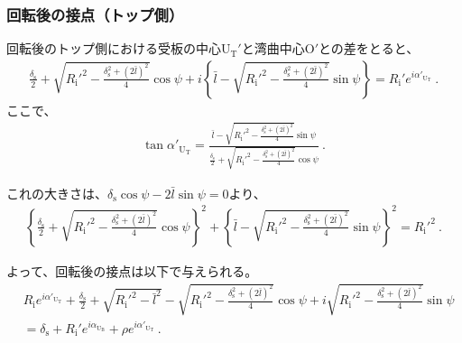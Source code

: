 \clearpage
\subsubsection{回転後の接点（トップ側）}
回転後のトップ側における受板の中心U$_\mathrm T'$と湾曲中心O$'$との差をとると、
\begin{align*}
  \frac{\delta_\mathrm s}2+\sqrt{R_\mathrm i'^2-\frac{\delta_\mathrm s^2+(2\bar l)^2}4}\cos\psi
  +i\left\{\bar l-\sqrt{R_\mathrm i'^2-\frac{\delta_\mathrm s^2+(2\bar l)^2}4}\sin\psi\right\}
  = R_\mathrm i'e^{i\alpha'_{\mathrm U_\mathrm T}}\ .
\end{align*}
ここで、
\begin{align*}
  \tan\alpha'_{\mathrm U_\mathrm T}
  = \frac{\displaystyle\bar l-\sqrt{R_\mathrm i'^2-\frac{\delta_\mathrm s^2+(2\bar l)^2}4}\sin\psi}
         {\displaystyle\frac{\delta_\mathrm s}2+\sqrt{R_\mathrm i'^2-\frac{\delta_\mathrm s^2+(2\bar l)^2}4}\cos\psi}\ .
\end{align*}
\begin{hosoku}
これの大きさは、$\delta_\mathrm s\cos\psi-2\bar l\sin\psi = 0$より、
\begin{align*}
  \left\{\frac{\delta_\mathrm s}2+\sqrt{R_\mathrm i'^2-\frac{\delta_\mathrm s^2+(2\bar l)^2}4}\cos\psi\right\}^2
  +\left\{\bar l-\sqrt{R_\mathrm i'^2-\frac{\delta_\mathrm s^2+(2\bar l)^2}4}\sin\psi\right\}^2
  = R_\mathrm i'^2\ .
\end{align*}
\end{hosoku}
よって、回転後の接点は以下で与えられる。
\begin{align*}
  &  R_\mathrm ie^{i\alpha'_{\mathrm U_\mathrm T}}
     +\frac{\delta_\mathrm s}2+\sqrt{R_\mathrm i'^2-\bar l^2}-\sqrt{R_\mathrm i'^2-\frac{\delta_\mathrm s^2+(2\bar l)^2}4}\cos\psi
     +i\sqrt{R_\mathrm i'^2-\frac{\delta_\mathrm s^2+(2\bar l)^2}4}\sin\psi\\
  &= \delta_\mathrm s+R_\mathrm i'e^{i\alpha_{\mathrm U_\mathrm B}}+\rho e^{i\alpha'_{\mathrm U_\mathrm T}}\ .
\end{align*}


